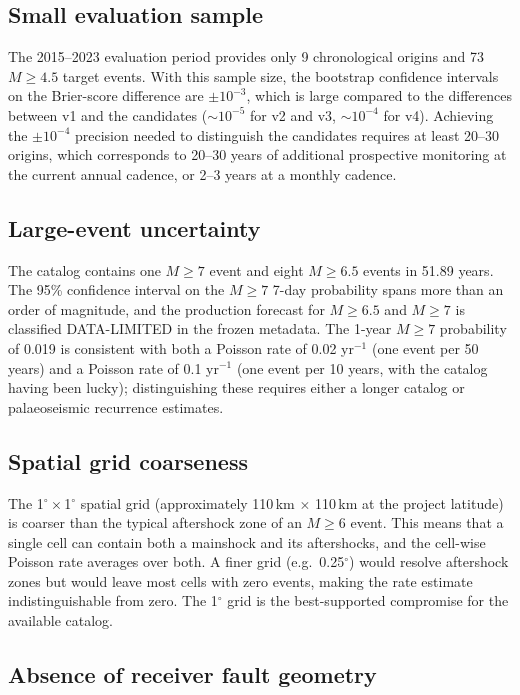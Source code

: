 \documentclass[10pt,a4paper,twocolumn]{article}
\begin{document}
\subsection{Small evaluation sample}

The 2015--2023 evaluation period provides only 9 chronological origins and 73 $M\geq4.5$ target events. With this sample size, the bootstrap confidence intervals on the Brier-score difference are $\pm10^{-3}$, which is large compared to the differences between v1 and the candidates ($\sim10^{-5}$ for v2 and v3, $\sim10^{-4}$ for v4). Achieving the $\pm10^{-4}$ precision needed to distinguish the candidates requires at least 20--30 origins, which corresponds to 20--30 years of additional prospective monitoring at the current annual cadence, or 2--3 years at a monthly cadence.

\subsection{Large-event uncertainty}

The catalog contains one $M\geq7$ event and eight $M\geq6.5$ events in 51.89 years. The 95\% confidence interval on the $M\geq7$ 7-day probability spans more than an order of magnitude, and the production forecast for $M\geq6.5$ and $M\geq7$ is classified DATA-LIMITED in the frozen metadata. The 1-year $M\geq7$ probability of 0.019 is consistent with both a Poisson rate of 0.02 yr$^{-1}$ (one event per 50 years) and a Poisson rate of 0.1 yr$^{-1}$ (one event per 10 years, with the catalog having been lucky); distinguishing these requires either a longer catalog or palaeoseismic recurrence estimates.

\subsection{Spatial grid coarseness}

The 1$^\circ\times$1$^\circ$ spatial grid (approximately 110\,km $\times$ 110\,km at the project latitude) is coarser than the typical aftershock zone of an $M\geq6$ event. This means that a single cell can contain both a mainshock and its aftershocks, and the cell-wise Poisson rate averages over both. A finer grid (e.g.\ 0.25$^\circ$) would resolve aftershock zones but would leave most cells with zero events, making the rate estimate indistinguishable from zero. The 1$^\circ$ grid is the best-supported compromise for the available catalog.

\subsection{Absence of receiver fault geometry}
\end{document}
